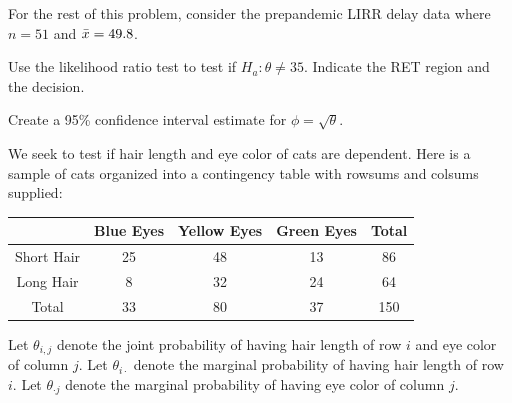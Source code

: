 \documentclass[12pt]{article}
\begin{document}
\begin{enumerate}[(a)]
For the rest of this problem, consider the prepandemic LIRR delay data where $n=51$ and $\bar{x} = 49.8$.

 Use the likelihood ratio test to test if $H_a: \theta \neq 35$. Indicate the RET region and the decision.


 Create a 95\% confidence interval estimate for $\phi = \sqrt{\theta}$.\\


\end{enumerate}
\vfill
\problem We seek to test if hair length and eye color of cats are dependent. Here is a sample of cats organized into a contingency table with rowsums and colsums supplied:
\pagebreak

\begin{table}[htp]
\centering
\begin{tabular}{c|ccc|c}
                & Blue Eyes & Yellow Eyes & Green Eyes & Total \\ \hline
Short Hair  & 25           & 48              &  13             & 86 \\
Long Hair   & 8            & 32              &  24             & 64 \\ \hline
Total         & 33           & 80              &  37             & 150 \\ 
\end{tabular}
\end{table}

Let $\theta_{i,j}$ denote the joint probability of having hair length of row $i$ and eye color of column $j$. Let $\theta_{i \cdot}$ denote the marginal probability of having hair length of row $i$.  Let $\theta_{\cdot j}$ denote the marginal probability of having eye color of column $j$. 
\end{document}
